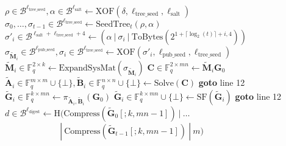 \begin{algorithm}[H]
\begin{algorithmic}[1]
\State $\rho \in \mathcal{B}^{\ell_\text{tree\_seed}}, \alpha \in \mathcal{B}^{\ell_\text{salt}} \gets \text{XOF}(\delta, \ell_\text{tree\_seed}, \ell_\text{salt})$
\State $\sigma_0, \ldots, \sigma_{t-1} \in \mathcal{B}^{\ell_\text{tree\_seed}} \gets \text{SeedTree}_t(\rho, \alpha)$
    \State $\sigma'_i \in \mathcal{B}^{\ell_\text{salt} + \ell_\text{tree\_seed} + 4} \gets (\alpha~|~\sigma_i~|~\text{ToBytes}(2^{1 + \lceil \log_2(t) \rceil + i, 4}))$
    \State $\sigma_{\tilde{\textbf{M}}_i} \in \mathcal{B}^{\ell_\text{pub\_seed}}, \sigma_i \in \mathcal{B}^{\ell_\text{tree\_seed}} \gets \text{XOF}(\sigma'_i, \ell_\text{pub\_seed}, \ell_\text{tree\_seed})$
    \State $\tilde{\textbf{M}}_i \in \mathds{F}_q^{2 \times k} \gets \text{ExpandSysMat}(\sigma_{\tilde{\textbf{M}}_i})$
    \State $\textbf{C} \in \mathds{F}_q^{2 \times mn} \gets \tilde{\textbf{M}}_i \textbf{G}_0$
    \State $\widetilde{\textbf{A}}_i \in \mathds{F}_q^{m \times m} \cup \{\bot\}, \widetilde{\textbf{B}}_i \in \mathds{F}_q^{n \times n} \cup \{\bot\} \gets \text{Solve}(\textbf{C})$
        \State \textbf{goto} line 12 %
    \EndIf
    \State $\tilde{\textbf{G}}_i \in \mathds{F}_q^{k \times mn} \gets \pi_{\widetilde{\textbf{A}}_i, \widetilde{\textbf{B}}_i}(\textbf{G}_0)$
    \State $\tilde{\textbf{G}}_i \in \mathds{F}_q^{k \times mn} \cup \{\bot\} \gets \text{SF}(\tilde{\textbf{G}}_i)$
        \State \textbf{goto} line 12 %
    \EndIf
\EndFor
\State $d \in \mathcal{B}^{\ell_\text{digest}} \gets \text{H}(\text{Compress}(\tilde{\textbf{G}}_0[;k,mn-1])~|~\ldots$\\
$\quad\quad\quad\quad\quad\quad~~|~\text{Compress}(\tilde{\textbf{G}}_{t-1}[;k,mn-1])~|~m)$

\end{algorithmic}
\end{algorithm}
